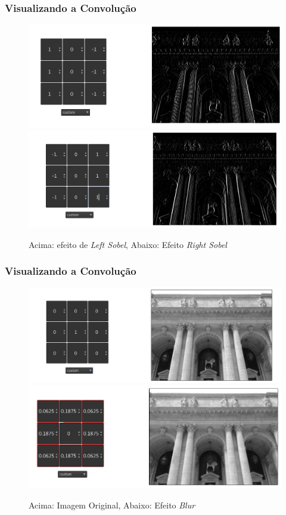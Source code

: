 \documentclass[tikz,10pt]{beamer}
\begin{document}
\begin{frame}
	\frametitle{Visualizando a Convolução}
	\centering
	
	\begin{figure}[t!]
		\centering
		\includegraphics[width=0.7\linewidth]{images/convolucao/004_left_sobel} \\
		\includegraphics[width=0.7\linewidth]{images/convolucao/005_right_sobel} \\
		\caption{Acima: efeito de \textit{Left Sobel}, Abaixo: Efeito \textit{Right Sobel}}
		\label{fig:left_right_sobel}
	\end{figure}
\end{frame}

\begin{frame}
	\frametitle{Visualizando a Convolução}
	\centering
	\begin{figure}
		\centering
		\includegraphics[width=0.7\linewidth]{images/convolucao/001_sem_filtro} \\
		\includegraphics[width=0.7\linewidth]{images/convolucao/002_blur}		
		\caption{Acima: Imagem Original, Abaixo: Efeito \textit{Blur}}
		\label{fig:orig_blur}
	\end{figure}
	
\end{frame}
\end{document}
